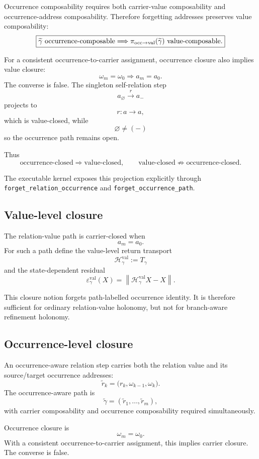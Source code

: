 \documentclass[11pt]{article}
\newcommand{\codeid}[1]{\nolinkurl{#1}}
\begin{document}
Occurrence composability requires both carrier-value composability and
occurrence-address composability. Therefore forgetting addresses preserves
value composability:
\[
\boxed{
\widetilde\gamma
\text{ occurrence-composable}
\Longrightarrow
\pi_{\rm occ\to val}(\widetilde\gamma)
\text{ value-composable}.
}
\]

For a consistent occurrence-to-carrier assignment, occurrence closure also
implies value closure:
\[
\boxed{
\omega_m=\omega_0
\Longrightarrow
a_m=a_0.
}
\]
The converse is false. The singleton self-relation step
\[
a_{\varnothing}
\xrightarrow{r}
a_{-}
\]
projects to
\[
r:a\to a,
\]
which is value-closed, while
\[
\varnothing\neq(-)
\]
so the occurrence path remains open.

Thus
\[
\boxed{
\text{occurrence-closed}
\Rightarrow
\text{value-closed},
\qquad
\text{value-closed}
\not\Rightarrow
\text{occurrence-closed}.
}
\]

The executable kernel exposes this projection explicitly through
\codeid{forget_relation_occurrence} and
\codeid{forget_occurrence_path}.

\subsection{Value-level closure}

The relation-value path is carrier-closed when
\[
\boxed{
a_m=a_0.
}
\]
For such a path define the value-level return transport
\[
\boxed{
\mathcal H^{\mathrm{val}}_{\gamma}:=T_{\gamma}
}
\]
and the state-dependent residual
\[
\boxed{
\varepsilon^{\mathrm{val}}_{\gamma}(X)
=
\left\|
\mathcal H^{\mathrm{val}}_{\gamma}X-X
\right\|.
}
\]

This closure notion forgets path-labelled occurrence identity. It is therefore
sufficient for ordinary relation-value holonomy, but not for branch-aware
refinement holonomy.

\subsection{Occurrence-level closure}

An occurrence-aware relation step carries both the relation value and its
source/target occurrence addresses:
\[
\tilde r_k
=
\bigl(
r_k,
\omega_{k-1},
\omega_k
\bigr).
\]
The occurrence-aware path is
\[
\widetilde\gamma
=
(\tilde r_1,\ldots,\tilde r_m),
\]
with carrier composability and occurrence composability required
simultaneously.

Occurrence closure is
\[
\boxed{
\omega_m=\omega_0.
}
\]
With a consistent occurrence-to-carrier assignment, this implies carrier
closure. The converse is false.
\end{document}
